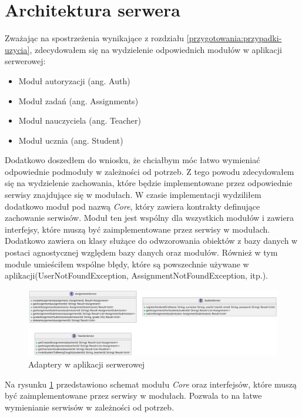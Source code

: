 \section{Architektura serwera}\label{serwer:architektura}
Zważając na spostrzeżenia wynikające z rozdziału \ref{przygotowania:przypadki-uzycia}, zdecydowałem się na wydzielenie odpowiednich modułów w aplikacji serwerowej:
\begin{itemize}
    \item Moduł autoryzacji (ang. Auth)
    \item Moduł zadań (ang. Assignments)
    \item Moduł nauczyciela (ang. Teacher)
    \item Moduł ucznia (ang. Student)
\end{itemize}
Dodatkowo doszedłem do wniosku, że chciałbym móc łatwo wymieniać odpowiednie podmoduły w zależności od potrzeb.
Z tego powodu zdecydowałem się na wydzielenie zachowania, które będzie implementowane przez odpowiednie serwisy znajdujące się w modułach.
W czasie implementacji wydziliłem dodatkowo moduł pod nazwą \textit{Core}, który zawiera kontrakty definujące zachowanie serwisów.
Moduł ten jest wspólny dla wszystkich modułów i zawiera interfejsy, które muszą być zaimplementowane przez serwisy w modułach.
Dodatkowo zawiera on klasy służące do odwzorowania obiektów z bazy danych w postaci agnostycznej względem bazy danych oraz modułów.
Również w tym module umieściłem wspólne błędy, które są powszechnie używane w aplikacji(UserNotFoundException, AssignmentNotFoundException, itp.).
\begin{figure}[H]
    \centering
    \includegraphics[width=15cm,keepaspectratio]{rysunki/adapters.png}
    \caption{Adaptery w aplikacji serwerowej}
    \label{fig:adapters}
\end{figure}

Na rysunku \ref{fig:adapters} przedstawiono schemat modułu \textit{Core} oraz interfejsów, które muszą być zaimplementowane przez serwisy w modułach.
Pozwala to na łatwe wymienianie serwisów w zależności od potrzeb.


